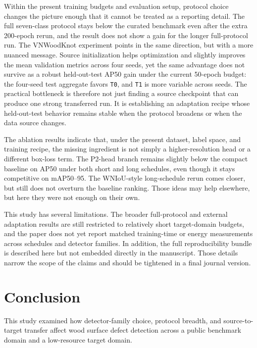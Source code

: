 \documentclass[10pt,a4paper]{article}
\begin{document}
Within the present training budgets and evaluation setup, protocol choice changes the picture enough that it cannot be treated as a reporting detail. The full seven-class protocol stays below the curated benchmark even after the extra 200-epoch rerun, and the result does not show a gain for the longer full-protocol run. The VNWoodKnot experiment points in the same direction, but with a more nuanced message. Source initialization helps optimization and slightly improves the mean validation metrics across four seeds, yet the same advantage does not survive as a robust held-out-test AP50 gain under the current 50-epoch budget: the four-seed test aggregate favors \texttt{T0}, and \texttt{T1} is more variable across seeds. The practical bottleneck is therefore not just finding a source checkpoint that can produce one strong transferred run. It is establishing an adaptation recipe whose held-out-test behavior remains stable when the protocol broadens or when the data source changes.

The ablation results indicate that, under the present dataset, label space, and training recipe, the missing ingredient is not simply a higher-resolution head or a different box-loss term. The P2-head branch remains slightly below the compact baseline on AP50 under both short and long schedules, even though it stays competitive on mAP50--95. The WNIoU-style long-schedule rerun comes closer, but still does not overturn the baseline ranking. Those ideas may help elsewhere, but here they were not enough on their own.

This study has several limitations. The broader full-protocol and external adaptation results are still restricted to relatively short target-domain budgets, and the paper does not yet report matched training-time or energy measurements across schedules and detector families. In addition, the full reproducibility bundle is described here but not embedded directly in the manuscript. Those details narrow the scope of the claims and should be tightened in a final journal version.

\section{Conclusion}
\label{sec:conclusion}

This study examined how detector-family choice, protocol breadth, and source-to-target transfer affect wood surface defect detection across a public benchmark domain and a low-resource target domain.
\end{document}
